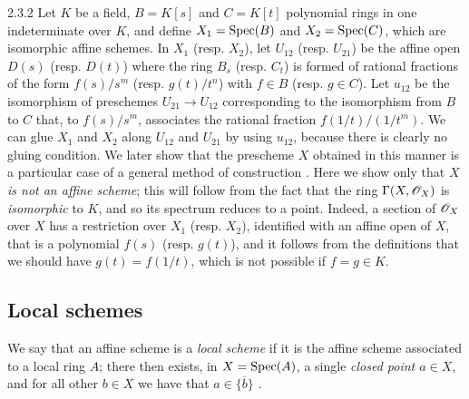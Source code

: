 \begin{env}[Example]{2.3.2}
\label{1.2.3.2}
Let $K$ be a field, $B=K[s]$ and $C=K[t]$ polynomial rings in one indeterminate over $K$, and define $X_1={\mathop{\mathrm{Spec}}\nolimits}(B)$ and $X_2={\mathop{\mathrm{Spec}}\nolimits}(C)$, which are isomorphic affine schemes.
In $X_1$ (resp. $X_2$), let $U_{12}$ (resp. $U_{21}$) be the affine open $D(s)$ (resp. $D(t)$) where the ring $B_s$ (resp. $C_t$) is formed of rational fractions of the form $f(s)/s^m$ (resp. $g(t)/t^n$) with $f\in B$ (resp. $g\in C$).
Let $u_{12}$ be the isomorphism of preschemes $U_{21}\to U_{12}$ corresponding  to the isomorphism from $B$ to $C$ that, to $f(s)/s^m$, associates the rational fraction $f(1/t)/(1/t^m)$.
We can glue $X_1$ and $X_2$ along $U_{12}$ and $U_{21}$ by using $u_{12}$, because there is clearly no gluing condition.
We later show that the prescheme $X$ obtained in this manner is a particular case of a general method of construction .
Here we show only that $X$ \emph{is not an affine scheme};
this will follow from the fact that the ring $\Gamma(X,\mathscr{O}_X)$ is \emph{isomorphic} to $K$, and so its spectrum reduces to a point.
Indeed, a section of $\mathscr{O}_X$ over $X$ has a restriction over $X_1$ (resp. $X_2$), identified with an affine open of $X$, that is a polynomial $f(s)$ (resp. $g(t)$), and it follows from the definitions that we should have $g(t)=f(1/t)$, which is not possible if $f=g\in K$.
\end{env}

\subsection{Local schemes}
\label{subsection:local-schemes}

\begin{env}[2.4.1]
\label{1.2.4.1}
We say that an affine scheme is a \emph{local scheme} if it is the affine scheme associated to a local ring $A$;
there then exists, in $X={\mathop{\mathrm{Spec}}\nolimits}(A)$, a single \emph{closed point $a\in X$}, and for all other $b\in X$ we have that $a\in\overline{\{b\}}$ .
\end{env}


